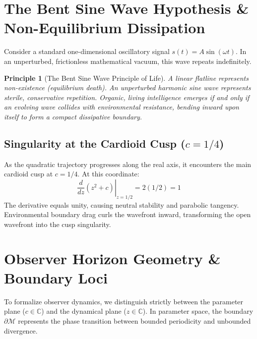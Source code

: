 \documentclass[10pt,journal,compsoc,twocolumn]{article}
\newtheorem{principle}{Principle}
\begin{document}
\section{The Bent Sine Wave Hypothesis \& Non-Equilibrium Dissipation}
\label{sec:bent_sine}
Consider a standard one-dimensional oscillatory signal $s(t) = A \sin(\omega t)$. In an unperturbed, frictionless mathematical vacuum, this wave repeats indefinitely. 

\begin{principle}[The Bent Sine Wave Principle of Life]
A linear flatline represents non-existence (equilibrium death). An unperturbed harmonic sine wave represents sterile, conservative repetition. Organic, living intelligence emerges if and only if an evolving wave collides with environmental resistance, bending inward upon itself to form a compact dissipative boundary.
\end{principle}

\subsection{Singularity at the Cardioid Cusp ($c = 1/4$)}
As the quadratic trajectory progresses along the real axis, it encounters the main cardioid cusp at $c = 1/4$. At this coordinate:
\begin{equation}
\left.\frac{d}{dz} (z^2 + c)\right|_{z = 1/2} = 2(1/2) = 1
\end{equation}
The derivative equals unity, causing neutral stability and parabolic tangency. Environmental boundary drag curls the wavefront inward, transforming the open wavefront into the cusp singularity.

\section{Observer Horizon Geometry \& Boundary Loci}
\label{sec:observer_horizon}
To formalize observer dynamics, we distinguish strictly between the parameter plane ($c \in \mathbb{C}$) and the dynamical plane ($z \in \mathbb{C}$). In parameter space, the boundary $\partial \mathcal{M}$ represents the phase transition between bounded periodicity and unbounded divergence.
\end{document}
